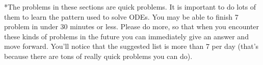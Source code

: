 *The problems in these sections are quick problems. It is important to do lots of them to learn the pattern used to solve ODEs. You may be able to finish 7 problem in under 30 minutes or less.  Please do more, so that when you encounter these kinds of problems in the future you can immediately give an answer and move forward. You'll notice that the suggested list is more than 7 per day (that's because there are tons of really quick problems you can do).

